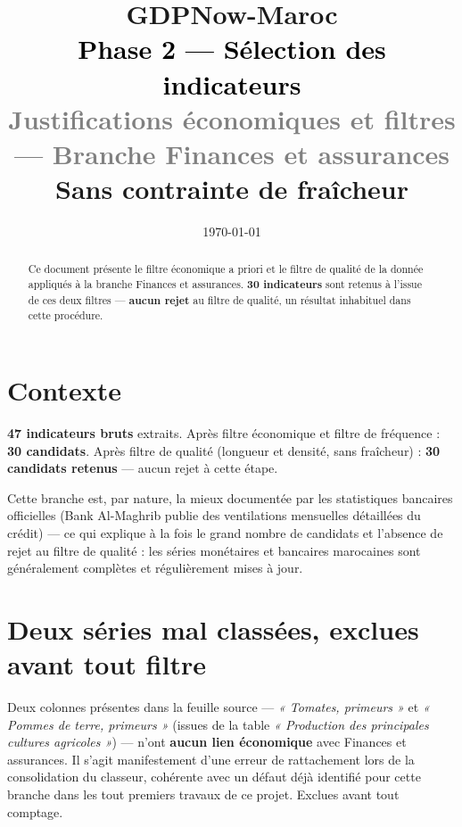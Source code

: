 \documentclass[11pt,a4paper]{article}
\title{\vspace{-1.3cm}\textcolor{bleuprincip}{\Huge\bfseries GDPNow-Maroc}\\[0.3cm]
\textcolor{black}{\Large Phase 2 --- Sélection des indicateurs}\\[0.15cm]
\textcolor{gray}{\large Justifications économiques et filtres --- Branche Finances et assurances}\\[0.1cm]
\textcolor{orangealerte}{\normalsize Sans contrainte de fraîcheur}}
\author{}
\date{\today}
\begin{document}
\maketitle
\thispagestyle{empty}

\begin{abstract}
\noindent Ce document présente le filtre économique a priori et le filtre de qualité de la donnée appliqués à la branche Finances et assurances. \textbf{30 indicateurs} sont retenus à l'issue de ces deux filtres --- \textbf{aucun rejet} au filtre de qualité, un résultat inhabituel dans cette procédure.
\end{abstract}

\tableofcontents
\vspace{0.3cm}

\section{Contexte}

\begin{fichebox}
\textbf{47 indicateurs bruts} extraits. Après filtre économique et filtre de fréquence : \textbf{30 candidats}. Après filtre de qualité (longueur et densité, sans fraîcheur) : \textbf{30 candidats retenus} --- aucun rejet à cette étape.
\end{fichebox}

Cette branche est, par nature, la mieux documentée par les statistiques bancaires officielles (Bank Al-Maghrib publie des ventilations mensuelles détaillées du crédit) --- ce qui explique à la fois le grand nombre de candidats et l'absence de rejet au filtre de qualité : les séries monétaires et bancaires marocaines sont généralement complètes et régulièrement mises à jour.

\section{Deux séries mal classées, exclues avant tout filtre}

\begin{alertebox}
Deux colonnes présentes dans la feuille source --- \textit{« Tomates, primeurs »} et \textit{« Pommes de terre, primeurs »} (issues de la table \textit{« Production des principales cultures agricoles »}) --- n'ont \textbf{aucun lien économique} avec Finances et assurances. Il s'agit manifestement d'une erreur de rattachement lors de la consolidation du classeur, cohérente avec un défaut déjà identifié pour cette branche dans les tout premiers travaux de ce projet. Exclues avant tout comptage.
\end{alertebox}
\end{document}
